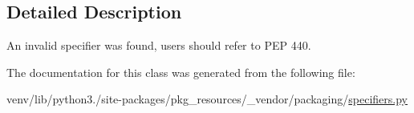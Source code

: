 \subsection{Detailed Description}
\begin{DoxyVerb}An invalid specifier was found, users should refer to PEP 440.
\end{DoxyVerb}
 

The documentation for this class was generated from the following file\+:\begin{DoxyCompactItemize}
\item 
venv/lib/python3./site-\/packages/pkg\+\_\+resources/\+\_\+vendor/packaging/\hyperlink{pkg__resources_2__vendor_2packaging_2specifiers_8py}{specifiers.\+py}\end{DoxyCompactItemize}

